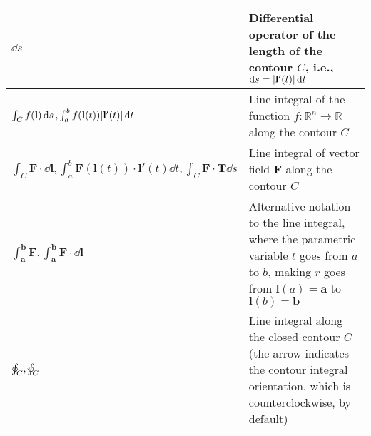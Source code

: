 \documentclass{article}
\begin{document}
\begin{xltabular}{\textwidth}{XX}
	\(\dd{s}\)                                                                                                                                                                                                                                 & Differential operator of the length of the contour \(C\), i.e., \(\dd{s} = \abs{\mathbf{l}'(t)} \dd{t}\) \cite{stewartCalculus2011}                                                                                                                     \\ \hline
	\(\int_C f(\mathbf{l}) \dd{s}, \int_a^b f(\mathbf{l}(t)) \abs{\mathbf{l}'(t)} \dd{t}\)                                                                                                                                                     & Line integral of the function \(f: \mathbb{R}^{n} \rightarrow \mathbb{R}\) along the contour \(C\) \cite{apostolCalculus2ndEdn1967,stewartCalculus2011}                                                                                                 \\ \hline
	\(\int_C \mathbf{F}\cdot\dd{\mathbf{l}}, \int_a^b \mathbf{F}(\mathbf{l}(t)) \cdot \mathbf{l}'(t) \dd{t}, \int_C \mathbf{F}\cdot\mathbf{T} \dd{s}\)                                                                                         & Line integral of vector field \(\mathbf{F}\) along the contour \(C\)  \cite{apostolCalculus2ndEdn1967,stewartCalculus2011}                                                                                                                              \\ \hline
	\(\int_\mathbf{a}^\mathbf{b} \mathbf{F}, \int_\mathbf{a}^\mathbf{b} \mathbf{F}\cdot\dd{\mathbf{l}}\)                                                                                                                                       & Alternative notation to the line integral, where the parametric variable \(t\) goes from \(a\) to \(b\), making \(r\) goes from \(\mathbf{l}(a) = \mathbf{a}\) to \(\mathbf{l}(b) = \mathbf{b}\) \cite{apostolCalculus2ndEdn1967}                       \\ \hline
	\(\oint_C, \varointctrclockwise_C\)                                                                                                                                                                                                        & Line integral along the closed contour \(C\) (the arrow indicates the contour integral orientation, which is counterclockwise, by default)                                                                                                              \\ \hline

\end{xltabular}
\end{document}
